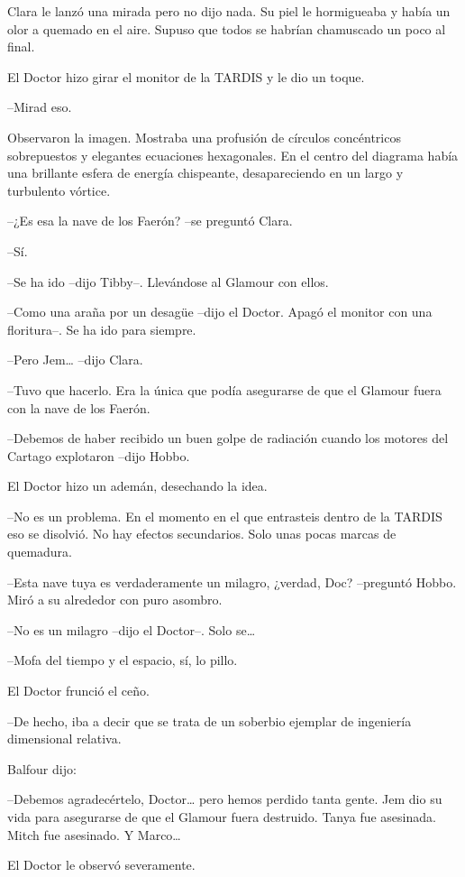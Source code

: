 {Clara le lanzó una mirada pero no dijo nada. Su piel le hormigueaba y
 había un olor a quemado en el aire. Supuso que todos se habrían
chamuscado un poco al final.}

{El Doctor hizo girar el monitor de la TARDIS y le dio un toque.}

{--Mirad eso.}

{Observaron la imagen. Mostraba una profusión de círculos concéntricos
 sobrepuestos y elegantes ecuaciones hexagonales. En el centro del
 diagrama había una brillante esfera de energía chispeante,
desapareciendo en un largo y turbulento vórtice.}

{--¿Es esa la nave de los Faerón? --se preguntó Clara.}

{--Sí.}

{--Se ha ido --dijo Tibby--. Llevándose al Glamour con ellos.}

{--Como una araña por un desagüe --dijo el Doctor. Apagó el monitor con
una floritura--. Se ha ido para siempre.}

{--Pero Jem\ldots{} --dijo Clara.}

{--Tuvo que hacerlo. Era la única que podía asegurarse de que el Glamour
fuera con la nave de los Faerón.}

{--Debemos de haber recibido un buen golpe de radiación cuando los
motores del Cartago explotaron --dijo Hobbo.}

{El Doctor hizo un ademán, desechando la idea.}

{--No es un problema. En el momento en el que entrasteis dentro de la
 TARDIS eso se disolvió. No hay efectos secundarios. Solo unas pocas
marcas de quemadura.}

{--Esta nave tuya es verdaderamente un milagro, ¿verdad, Doc? --preguntó
Hobbo. Miró a su alrededor con puro asombro.}

{--No es un milagro --dijo el Doctor--. Solo se\ldots{}}

{--Mofa del tiempo y el espacio, sí, lo pillo.}

{El Doctor frunció el ceño.}

{--De hecho, iba a decir que se trata de un soberbio ejemplar de
ingeniería dimensional relativa.}

{Balfour dijo:}

{--Debemos agradecértelo, Doctor\ldots{} pero hemos perdido tanta gente.
 Jem dio su vida para asegurarse de que el Glamour fuera destruido. Tanya
 fue asesinada. Mitch fue asesinado. Y Marco\ldots{}}

{El Doctor le observó severamente.}

